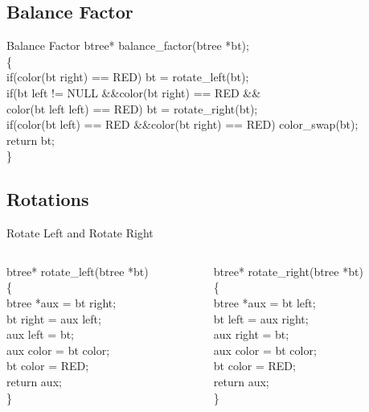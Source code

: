 \documentclass{beamer}
\begin{document}
\subsection{Balance Factor}
\begin{frame}{Balance Factor}
btree* balance\_factor(btree *bt);\\
\{\\
    if(color(bt \rightarrow right) == RED) \quad bt = rotate\_left(bt);\\
    if(bt \rightarrow left != NULL \quad\&\&\quad color(bt \rightarrow right) == RED \quad\&\&\quad \\ color(bt \rightarrow left \rightarrow left) == RED) \quad bt = rotate\_right(bt);\\
    if(color(bt \rightarrow left) == RED \quad\&\&\quad color(bt \rightarrow right) == RED) \quad color\_swap(bt);\\
    return bt;\\
\}    
\end{frame}

\subsection{Rotations}
\begin{frame}{Rotate Left and Rotate Right}
\begin{columns}
\begin{column}{0.5\textwidth}
   \justifying
   btree* rotate\_left(btree *bt)\\
\{\\
    btree *aux = bt \rightarrow right;\\
    bt \rightarrow right = aux \rightarrow left;\\
    aux \rightarrow left = bt;\\
    aux \rightarrow color = bt \rightarrow color;\\
    bt \rightarrow color = RED;\\
    return aux;\\
\}
\end{column}
\begin{column}{0.5\textwidth}
    \justifying
    btree* rotate\_right(btree *bt)\\
\{\\
    btree *aux = bt \rightarrow left;\\
    bt \rightarrow left = aux \rightarrow right;\\
    aux \rightarrow right = bt;\\
    aux \rightarrow color = bt \rightarrow color;\\
    bt \rightarrow color = RED;\\
    return aux;\\
\}
\end{column}
\end{columns}
\end{frame}
\end{document}
